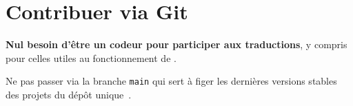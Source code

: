 \documentclass{../main/main}
\begin{document}
\section{Contribuer via Git}

\begin{tdocnote}
    \textbf{Nul besoin d'être un codeur pour participer aux traductions}, y compris pour celles utiles au fonctionnement de \thisproj.
\end{tdocnote}


\begin{tdoccaut}
	Ne pas passer via la branche \verb#main# qui sert à figer les dernières versions stables des projets du dépôt unique \thismonorepo\,.
\end{tdoccaut}
\end{document}

